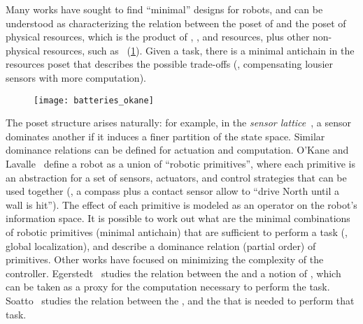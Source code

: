 Many works have sought to find ``minimal'' designs for robots, and
can be understood as characterizing the relation between the poset
of  and the poset of physical resources, which is the product
of , , and  resources,
plus other non-physical resources, such as ~(\cref{fig:robot-generic}).
Given a task, there is a minimal antichain in the resources poset
that describes the possible trade-offs (\eg , compensating lousier
sensors with more computation).

\begin{figure}
  \centering
  \texttt{[image: batteries\_okane]}
  \caption{}
  \label{fig:robot-generic}
\end{figure}

\begin{figure}
  \centering
  \caption{}
\end{figure}



The poset structure arises naturally: for example, in the \emph{sensor
lattice}~\cite{lavalle12sensing}, a sensor dominates another
if it induces a finer partition of the state space. Similar dominance
relations can be defined for actuation and computation. O'Kane and
Lavalle~\cite{okane08comparing} define a robot as a union of ``robotic
primitives'', where each primitive is an abstraction for a set of
sensors, actuators, and control strategies that can be used together
(\eg , a compass plus a contact sensor allow to ``drive North until
a wall is hit''). The effect of each primitive is modeled as an operator
on the robot's information space. It is possible to work out what
are the minimal combinations of robotic primitives (minimal antichain)
that are sufficient to perform a task (\eg , global localization),
and describe a dominance relation (partial order) of primitives. Other
works have focused on minimizing the complexity of the controller.
Egerstedt~\cite{egerstedt03motion} studies the relation between
the  and a notion of , which can be taken as
a proxy for the computation necessary to perform the task. Soatto~\cite{soatto11steps}
studies the relation between the ,
and the  that is needed to perform that
task.



\begin{example}
\end{example}

